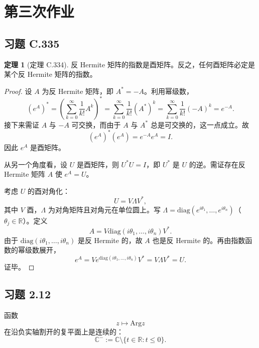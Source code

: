 \documentclass[11pt,a4paper]{article}
\newcommand{\R}{\mathbb{R}}
\newcommand{\C}{\mathbb{C}}
\newcommand{\Arg}{\mathrm{Arg}}
\theoremstyle{definition}
\newtheorem{theorem}{定理}[section]
\begin{document}
\section{第三次作业}

\subsection{习题 C.335}

\begin{theorem}[定理 C.334]
  反 Hermite 矩阵的指数是酉矩阵。反之，任何酉矩阵必定是某个反 Hermite 矩阵的指数。
\end{theorem}

\begin{proof}
设 $A$ 为反 Hermite 矩阵，即 $A^*=-A$。利用幂级数，
\[
  (e^A)^* = \left( \sum_{k=0}^\infty \frac{1}{k!} A^k\right)^*
  = \sum_{k=0}^\infty \frac{1}{k!} (A^*)^k
  = \sum_{k=0}^\infty \frac{1}{k!} (-A)^k
  = e^{-A}.
\]
接下来需证 $A$ 与 $-A$ 可交换，而由于 $A$ 与 $A^*$ 总是可交换的，这一点成立。故
\[
  (e^A)^*(e^A) = e^{-A} e^A = I.
\]
因此 $e^A$ 是酉矩阵。

从另一个角度看，设 $U$ 是酉矩阵，则 $U^*U=I$，即 $U^*$ 是 $U$ 的逆。需证存在反 Hermite 矩阵 $A$ 使 $e^A=U$。

考虑 $U$ 的酉对角化：
\[
  U = V \Lambda V^*,
\]
其中 $V$ 酉，$\Lambda$ 为对角矩阵且对角元在单位圆上。写 $\Lambda = \mathrm{diag}(e^{i\theta_1}, \ldots, e^{i\theta_n})$（$\theta_j \in \R$）。定义
\[
  A = V \mathrm{diag}(i\theta_1, \ldots, i\theta_n) V^*.
\]
由于 $\mathrm{diag}(i\theta_1, \ldots, i\theta_n)$ 是反 Hermite 的，故 $A$ 也是反 Hermite 的。再由指数函数的幂级数展开，
\[
  e^A = V e^{\mathrm{diag}(i\theta_1, \ldots, i\theta_n)} V^* = V \Lambda V^* = U.
\]
证毕。
\end{proof}

\subsection{习题 2.12}

函数
\[
  z \mapsto \Arg z
\]
在沿负实轴割开的复平面上是连续的：
\[
  \C^- := \C \setminus \{t \in \R : t \le 0\}.
\]
\end{document}

